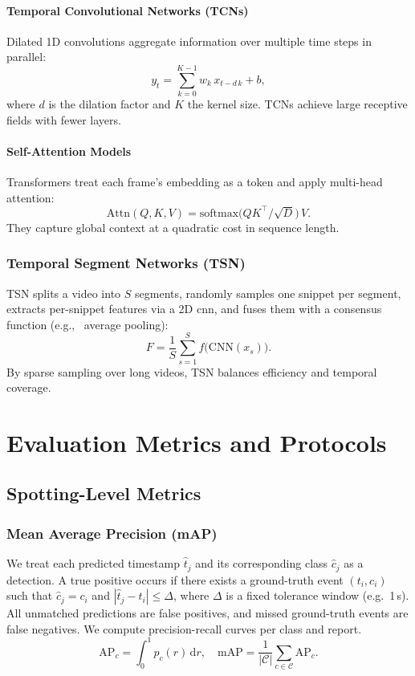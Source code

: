 \paragraph{Temporal Convolutional Networks (TCNs)}  
Dilated 1D convolutions aggregate information over multiple time steps in parallel:
\[
y_t = \sum_{k=0}^{K-1} w_k\,x_{t - d\,k} + b,
\]
where \(d\) is the dilation factor and \(K\) the kernel size. TCNs achieve large receptive fields with fewer layers.

\paragraph{Self-Attention Models}  
Transformers treat each frame's embedding as a token and apply multi-head attention:
\[
\mathrm{Attn}(Q,K,V) = \mathrm{softmax}\bigl(QK^\top/\sqrt{D}\bigr)\,V.
\]
They capture global context at a quadratic cost in sequence length.

\subsubsection{Temporal Segment Networks (TSN)}  
TSN splits a video into \(S\) segments, randomly samples one snippet per segment, extracts per-snippet features via a 2D \acrshort{cnn}, and fuses them with a consensus function (e.g., \ average pooling):
\[
F = \frac{1}{S}\sum_{s=1}^{S}f\bigl(\mathrm{CNN}(x_s)\bigr).
\]
By sparse sampling over long videos, TSN balances efficiency and temporal coverage.

\section{Evaluation Metrics and Protocols}
\label{sec:evaluation}

\subsection{Spotting-Level Metrics}
\subsubsection{Mean Average Precision (mAP)}
We treat each predicted timestamp $\hat t_j$ and its corresponding class $\hat c_j$ as a detection. A true positive occurs if there exists a ground-truth event $(t_i,c_i)$ such that $\hat c_j = c_i$ and $|\hat t_j - t_i|\le\Delta$, where $\Delta$ is a fixed tolerance window (e.g.\ 1\,s). All unmatched predictions are false positives, and missed ground-truth events are false negatives. We compute precision-recall curves per class and report.
\[
\mathrm{AP}_c = \int_{0}^{1} p_c(r)\,\mathrm{d}r,\quad
\mathrm{mAP} = \frac{1}{|\mathcal{C}|}\sum_{c\in\mathcal{C}}\mathrm{AP}_c.
\]

